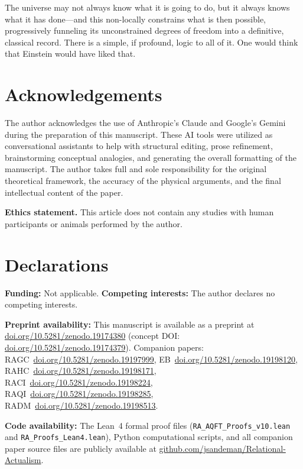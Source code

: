\documentclass[11pt,a4paper]{article}
\theoremstyle{plain}
\theoremstyle{definition}
\theoremstyle{remark}
\begin{document}
The universe may not always know what it is going to do, but it always knows what
it has done---and this non-locally constrains what is then possible, progressively
funneling its unconstrained degrees of freedom into a definitive, classical record.
There is a simple, if profound, logic to all of it. One would think that Einstein
would have liked that.

\section*{Acknowledgements}
The author acknowledges the use of Anthropic's Claude and Google's Gemini during
the preparation of this manuscript. These AI tools were utilized as conversational
assistants to help with structural editing, prose refinement, brainstorming
conceptual analogies, and generating the overall formatting of the manuscript. The
author takes full and sole responsibility for the original theoretical framework,
the accuracy of the physical arguments, and the final intellectual content of the
paper.

\smallskip\noindent
\textbf{Ethics statement.}
This article does not contain any studies with human participants
or animals performed by the author.

\section*{Declarations}
\textbf{Funding:} Not applicable.\quad
\textbf{Competing interests:} The author declares no competing interests.

\textbf{Preprint availability:} This manuscript is available as a preprint at
\href{https://doi.org/10.5281/zenodo.19174380}{doi.org/10.5281/zenodo.19174380}
(concept DOI: \href{https://doi.org/10.5281/zenodo.19174379}{doi.org/10.5281/zenodo.19174379}).
Companion papers: RAGC~\href{https://doi.org/10.5281/zenodo.19197999}{doi.org/10.5281/zenodo.19197999}, EB~\href{https://doi.org/10.5281/zenodo.19198120}{doi.org/10.5281/zenodo.19198120}, RAHC~\href{https://doi.org/10.5281/zenodo.19198171}{doi.org/10.5281/zenodo.19198171}, RACI~\href{https://doi.org/10.5281/zenodo.19198224}{doi.org/10.5281/zenodo.19198224}, RAQI~\href{https://doi.org/10.5281/zenodo.19198285}{doi.org/10.5281/zenodo.19198285}, RADM~\href{https://doi.org/10.5281/zenodo.19198513}{doi.org/10.5281/zenodo.19198513}.

\textbf{Code availability:} The Lean~4 formal proof files
(\texttt{RA\_AQFT\_Proofs\_v10.lean} and \texttt{RA\_Proofs\_Lean4.lean}),
Python computational scripts, and all companion paper source files are publicly
available at \href{https://github.com/jsandeman/Relational-Actualism}{github.com/jsandeman/Relational-Actualism}.
\end{document}
